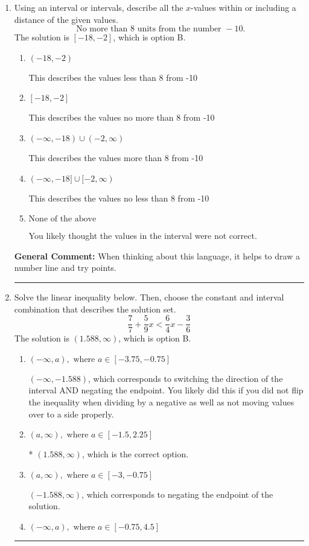 \documentclass{extbook}[14pt]
\newcommand{\litem}[1]{\item #1

\rule{\textwidth}{0.4pt}}
\begin{document}
\begin{enumerate}\litem{
Using an interval or intervals, describe all the $x$-values within or including a distance of the given values.
\[ \text{ No more than } 8 \text{ units from the number } -10. \]The solution is \( [-18, -2] \), which is option B.\begin{enumerate}[label=\Alph*.]
\item \( (-18, -2) \)

This describes the values less than 8 from -10
\item \( [-18, -2] \)

This describes the values no more than 8 from -10
\item \( (-\infty, -18) \cup (-2, \infty) \)

This describes the values more than 8 from -10
\item \( (-\infty, -18] \cup [-2, \infty) \)

This describes the values no less than 8 from -10
\item \( \text{None of the above} \)

You likely thought the values in the interval were not correct.
\end{enumerate}

\textbf{General Comment:} When thinking about this language, it helps to draw a number line and try points.
}
\litem{
Solve the linear inequality below. Then, choose the constant and interval combination that describes the solution set.
\[ \frac{7}{7} + \frac{5}{9} x < \frac{6}{4} x - \frac{3}{6} \]The solution is \( (1.588, \infty) \), which is option B.\begin{enumerate}[label=\Alph*.]
\item \( (-\infty, a), \text{ where } a \in [-3.75, -0.75] \)

 $(-\infty, -1.588)$, which corresponds to switching the direction of the interval AND negating the endpoint. You likely did this if you did not flip the inequality when dividing by a negative as well as not moving values over to a side properly.
\item \( (a, \infty), \text{ where } a \in [-1.5, 2.25] \)

* $(1.588, \infty)$, which is the correct option.
\item \( (a, \infty), \text{ where } a \in [-3, -0.75] \)

 $(-1.588, \infty)$, which corresponds to negating the endpoint of the solution.
\item \( (-\infty, a), \text{ where } a \in [-0.75, 4.5] \)


\end{enumerate}}
\end{enumerate}
\end{document}
